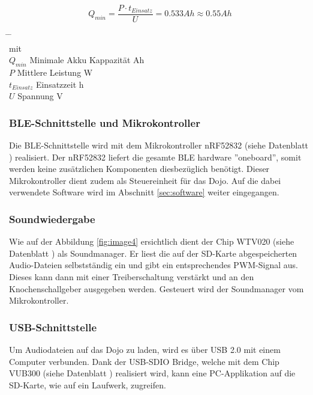 \documentclass[10pt,a4paper,oneside]{99_fhnwreport}
\begin{document}
\begin{equation}
Q_{min} = \frac{P \cdot t_{Einsatz}}{U} = 0.533Ah \approx 0.55Ah
\label{eq:equation1}
\end{equation}
\begin{tabbing}
\hspace{20mm}	\=  \hspace{60mm} \= \hspace{30mm}	\= 	\\
mit	\\
$Q_{min}$	\> Minimale Akku Kappazität	 Ah	\>	\\
$P$		\> Mittlere Leistung		 W \>	\\
$t_{Einsatz}$	\> Einsatzzeit			 h	\\
$U$		\> Spannung			 V	\\
\end{tabbing}

\subsubsection{BLE-Schnittstelle und Mikrokontroller}
Die BLE-Schnittstelle wird mit dem Mikrokontroller nRF52832 (siehe Datenblatt \cite{NRF52832}) realisiert. Der nRF52832 liefert die gesamte BLE hardware ''oneboard'', somit werden keine zusätzlichen Komponenten diesbezüglich benötigt. Dieser Mikrokontroller dient zudem als Steuereinheit für das Dojo. Auf die dabei verwendete Software wird im Abschnitt \ref{sec:software} weiter eingegangen.

\subsubsection{Soundwiedergabe} \label{sec:sound}
Wie auf der Abbildung \ref{fig:image4} ersichtlich dient der Chip WTV020 (siehe Datenblatt \cite{WTV020}) als Soundmanager. Er liest die auf der SD-Karte abgespeicherten Audio-Dateien selbstständig ein und gibt ein entsprechendes PWM-Signal aus. Dieses kann dann mit einer Treiberschaltung verstärkt und an den Knochenschallgeber ausgegeben werden. Gesteuert wird der Soundmanager vom  Mikrokontroller.

\subsubsection{USB-Schnittstelle}
Um Audiodateien auf das Dojo zu laden, wird es über USB 2.0 mit einem Computer verbunden. Dank der USB-SDIO Bridge, welche mit dem Chip VUB300 (siehe Datenblatt \cite{VUB300}) realisiert wird, kann eine PC-Applikation auf die SD-Karte, wie auf ein Laufwerk, zugreifen.
\end{document}
